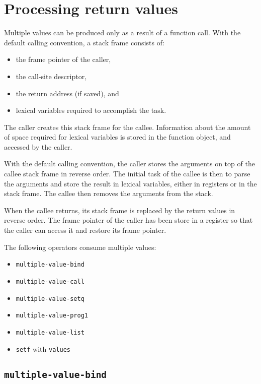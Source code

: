 \chapter{Processing return values}

Multiple values can be produced only as a result of a function call.
With the default calling convention, a stack frame consists of:

\begin{itemize}
\item the frame pointer of the caller,
\item the call-site descriptor,
\item the return address (if saved), and
\item lexical variables required to accomplish the task.
\end{itemize}

The caller creates this stack frame for the callee.  Information about
the amount of space required for lexical variables is stored in the
function object, and accessed by the caller.

With the default calling convention, the caller stores the arguments
on top of the callee stack frame in reverse order.  The initial task
of the callee is then to parse the arguments and store the result in
lexical variables, either in registers or in the stack frame.  The
callee then removes the arguments from the stack.

When the callee returns, its stack frame is replaced by the return
values in reverse order.  The frame pointer of the caller has been
store in a register so that the caller can access it and restore its
frame pointer.

The following operators consume multiple values:

\begin{itemize}
\item \texttt{multiple-value-bind}
\item \texttt{multiple-value-call}
\item \texttt{multiple-value-setq}
\item \texttt{multiple-value-prog1}
\item \texttt{multiple-value-list}
\item \texttt{setf} with \texttt{values}
\end{itemize}

\section{\texttt{multiple-value-bind}}

